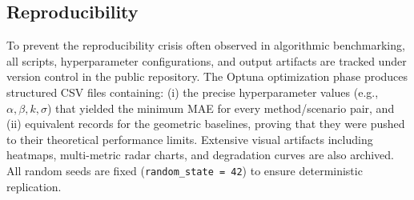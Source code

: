 \subsection{Reproducibility}
To prevent the reproducibility crisis often observed in algorithmic benchmarking, all scripts, hyperparameter configurations, and output artifacts are tracked under version control in the public repository. The Optuna optimization phase produces structured CSV files containing: (i) the precise hyperparameter values (e.g., $\alpha, \beta, k, \sigma$) that yielded the minimum MAE for every method/scenario pair, and (ii) equivalent records for the geometric baselines, proving that they were pushed to their theoretical performance limits. Extensive visual artifacts including heatmaps, multi-metric radar charts, and degradation curves are also archived. All random seeds are fixed (\texttt{random\_state = 42}) to ensure deterministic replication.
